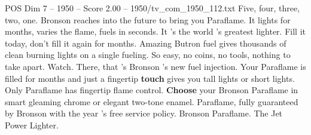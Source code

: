 \begin{textsample}{POS Dim 7 – 1950 – Score 2.00 – 1950/tv\_com\_1950\_112.txt}  \label{ex:f7_pos_019}
Five, four, three, two, one.
Bronson reaches into the future to bring you Paraflame.
It lights for months, varies the flame, fuels in seconds.
It 's the world 's greatest lighter.
Fill it today, don't fill it again for months.
Amazing Butron fuel gives thousands of clean burning lights on a single fueling.
So easy, no coins, no tools, nothing to take apart.
Watch.
There, that 's Bronson 's new fuel injection.
Your Paraflame is filled for months and just a fingertip \textbf{touch} gives you tall lights or short lights.
Only Paraflame has fingertip flame control. \textbf{Choose} your Bronson Paraflame in smart gleaming chrome or elegant two-tone enamel.
Paraflame, fully guaranteed by Bronson with the year 's free service policy.
Bronson Paraflame.
The Jet Power Lighter.

\end{textsample}
